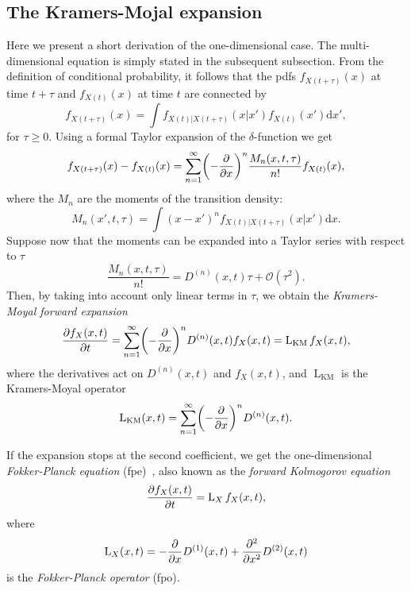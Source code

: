 \documentclass[a4paper,12pt]{book}
\begin{document}
\subsection{The Kramers-Mojal expansion}
Here we present a short derivation of the one-dimensional case. The multi-dimensional equation is simply stated in the subsequent subsection. From the definition of conditional probability, it follows that the \acrshort{pdf}s $f_{X(t+\tau)}(x)$ at time $t+\tau$ and $f_{X(t)}(x)$ at time $t$ are connected by
\begin{equation}
    f_{X(t+\tau)}(x) = \int f_{X(t)|X(t+\tau)}(x|x')f_{X(t)}(x')\mathrm{d}x',
\end{equation}
for $\tau \geq 0$. Using a formal Taylor expansion of the $\delta$-function we get
\begin{equation}
    f_{X(t+\tau)}(x)-f_{X(t)}(x) = \sum_{n=1}^{\infty}\biggl(-\pdv{}{x} \biggr)^n\frac{M_n(x,t,\tau)}{n!}f_{X(t)}(x),
\end{equation}
where the $M_n$ are the moments of the transition density:
\begin{equation}
    M_n(x',t,\tau) = \int (x-x')^n f_{X(t)|X(t+\tau)}(x|x')\mathrm{d}x.
\end{equation}
Suppose now that the moments can be expanded into a Taylor series with respect to $\tau$
\begin{equation}
    \frac{M_n(x,t,\tau)}{n!} = D^{(n)}(x,t) \tau + \mathcal{O}(\tau^2).
\end{equation}
Then, by taking into account only linear terms in $\tau$, we obtain the \textit{Kramers-Moyal forward expansion}~\parencite{KRAMERS1940,Moyal1949}
\begin{equation}
    \pdv{f_{X}(x,t)}{t} =  \sum_{n=1}^{\infty}\biggl(-\pdv{}{x} \biggr)^n D^{(n)}(x,t) f_{X}(x,t) = \operatorname{L}_{\text{KM}}f_{X}(x,t),
\end{equation}
where the derivatives act on $D^{(n)}(x,t)$ and $f_{X}(x,t)$, and $\operatorname{L}_{\text{KM}}$ is the Kramers-Moyal operator
\begin{equation}
 \operatorname{L}_{\text{KM}}(x,t)=\sum_{n=1}^{\infty}\biggl(-\pdv{}{x} \biggr)^n D^{(n)}(x,t).
\end{equation}

If the expansion stops at the second coefficient, we get the one-dimensional \textit{Fokker-Planck equation} (\acrshort{fpe})~\parencite{Fokker1914,Planck1917}, also known as the \textit{forward Kolmogorov equation}
\begin{equation}
    \label{eq:fpo_1d}
    \pdv{f_{X}(x,t)}{t} = \operatorname{L}_{X}f_{X}(x,t),
\end{equation}
where
\begin{equation}
    \operatorname{L}_{X}(x,t) = -\pdv{}{x}D^{(1)}(x,t) + \pdv[order={2}]{}{x}D^{(2)}(x,t)
\end{equation}
is the \textit{Fokker-Planck operator} (\acrshort{fpo}).
\end{document}
